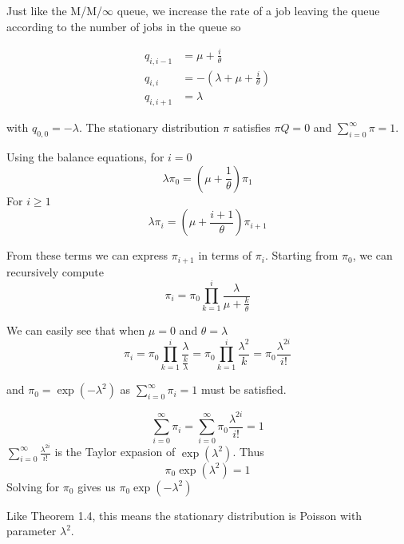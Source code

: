 \begin{solution}
    Just like the M/M/$\infty$ queue, we increase the rate of a job leaving the queue according to the number of jobs in the queue so

    \begin{align*}
        q_{i,i-1}& = \mu + \frac{i}{\theta}\\
        q_{i,i}  & = -(\lambda + \mu + \frac{i}{\theta})\\
        q_{i,i+1}& = \lambda
    \end{align*}

    with $q_{0,0} = -\lambda$. The stationary distribution $\pi$ satisfies $\pi Q=0$ and $\sum_{i=0}^\infty\pi=1$.

    Using the balance equations, for $i=0$
    \[
        \lambda\pi_0 = \left(\mu+\frac{1}{\theta}\right)\pi_1
    \]
    For $i\geq 1$
    \[
        \lambda\pi_i = \left(\mu+\frac{i+1}{\theta}\right)\pi_{i+1}
    \]

    From these terms we can express $\pi_{i+1}$ in terms of $\pi_i$. Starting from $\pi_0$, we can recursively compute
    \[
        \pi_i = \pi_0\prod_{k=1}^i\frac{\lambda}{\mu+\frac{k}{\theta}}
    \]

    We can easily see that when $\mu=0$ and $\theta=\lambda$
    \[
        \pi_i = \pi_0\prod_{k=1}^i\frac{\lambda}{\frac{k}{\lambda}}=\pi_0\prod_{k=1}^i\frac{\lambda^2}{k} = \pi_0\frac{\lambda^{2i}}{i!}
    \]

    and $\pi_0=\exp(-\lambda^2)$ as $\sum_{i=0}^\infty\pi_i=1$ must be satisfied.

    \[
        \sum_{i=0}^\infty\pi_i=\sum_{i=0}^\infty\pi_0\frac{\lambda^{2i}}{i!}=1
    \]
    $\sum_{i=0}^\infty\frac{\lambda^{2i}}{i!}$ is the Taylor expasion of $\exp(\lambda^2)$. Thus
    \[
        \pi_0\exp(\lambda^2) = 1
    \]
    Solving for $\pi_0$ gives us $\pi_0\exp(-\lambda^2)$

Like Theorem 1.4, this means the stationary distribution is Poisson with parameter $\lambda^2$.
\end{solution}
